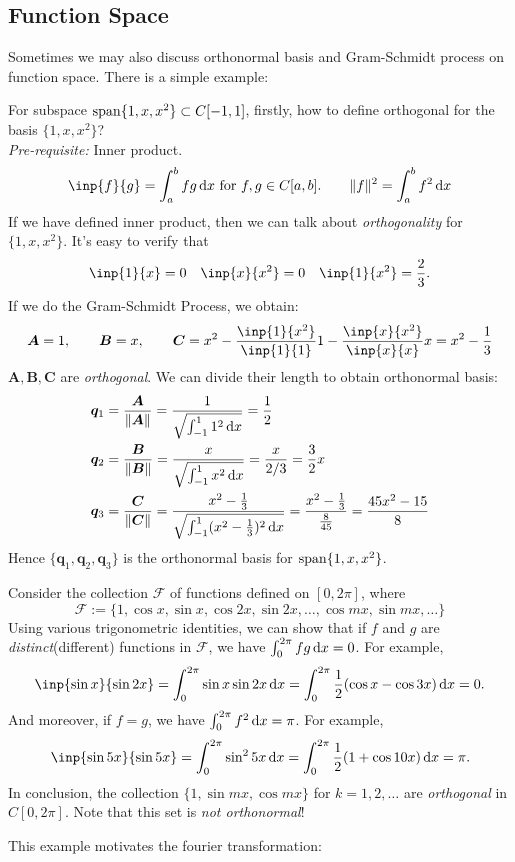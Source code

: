 \subsection{Function Space}
Sometimes we may also discuss orthonormal basis and Gram-Schmidt process on function space. There is a simple example:
\begin{example}
For subspace $\operatorname{span}\{1,x,x^2\}\subset C[-1,1]$, firstly, how to define orthogonal for the basis $\{1,x,x^2\}$?\\
\textit{Pre-requisite: }Inner product.
\[
\inp{f}{g}=\int_{a}^{b}fg\diff x \text{ for $f,g\in C[a,b]$.}\qquad
\|f\|^2=\int_{a}^{b}f^2\diff x
\]
If we have defined inner product, then we can talk about \textit{orthogonality} for $\{1,x,x^2\}$. It's easy to verify that
\[
\inp{1}{x}=0\quad\inp{x}{x^2}=0\quad\inp{1}{x^2}=\frac{2}{3}.
\]
If we do the Gram-Schmidt Process, we obtain:
\[
\bm A=1,\qquad\bm B=x,\qquad
\bm C=x^2-\frac{\inp{1}{x^2}}{\inp{1}{1}}1-\frac{\inp{x}{x^2}}{\inp{x}{x}}x=x^2-\frac{1}{3}
\]
$\bm A,\bm B,\bm C$ are \textit{orthogonal}. We can divide their length to obtain orthonormal basis:
\[
\begin{aligned}
\bm q_1&=\frac{\bm A}{\|\bm A\|}=\frac{1}{\sqrt{\int_{-1}^{1}1^2\,\mathrm{d} x}}=\frac{1}{2}\qquad\\
\bm q_2&=\frac{\bm B}{\|\bm B\|}=\frac{x}{\sqrt{\int_{-1}^{1}x^2 \,\mathrm{d} x}}=\frac{x}{2/3}=\frac{3}{2}x\qquad\\
\bm q_3&=\frac{\bm C}{\|\bm C\|}=\frac{x^2-\frac{1}{3}}{\sqrt{\int_{-1}^{1}(x^2-\frac{1}{3})^2 \,\mathrm{d} x}}=\frac{x^2-\frac{1}{3}}{\frac{8}{45}}=\frac{45x^2-15}{8}
\end{aligned}
\]
Hence $\{\bm q_1,\bm q_2, \bm q_3\}$ is the orthonormal basis for $\operatorname{span}\{1,x,x^2\}$.
\end{example}
\begin{example}
Consider the collection $\mathcal{F}$ of functions defined on $[0,2\pi]$, where
\[
\mathcal{F}:=\{1,\cos x,\sin x,\cos 2x,\sin 2x,\dots,\cos mx,\sin mx,\dots\}
\]
Using various trigonometric identities, we can show that if $f$ and $g$ are \emph{distinct}(different) functions in $\mathcal{F}$, we have $\int_{0}^{2\pi}fg\,\mathrm{d} x=0$. For example,
\[
\inp{\sin x}{\sin 2x}=\int_{0}^{2\pi}\sin x\sin 2x\diff x=\int_{0}^{2\pi}\frac{1}{2}(\cos x-\cos 3x)\diff x=0.
\]
And moreover, if $f=g$, we have $\int_{0}^{2\pi}f^2\,\mathrm{d} x=\pi$. For example,
\[
\inp{\sin 5x}{\sin 5x}=\int_{0}^{2\pi}\sin^2 5x\diff x=\int_{0}^{2\pi}\frac{1}{2}(1+\cos 10x)\diff x=\pi.
\]
In conclusion, the collection $\{1,\sin mx,\cos mx\}$ for $k=1,2,\dots$ are \textit{orthogonal} in $C[0,2\pi]$. Note that this set is \emph{not orthonormal}!
\end{example}
This example motivates the fourier transformation:
